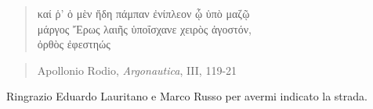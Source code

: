 \begin{verse}
	\begin{otherlanguage}{greek}
		καί ῥ' ὁ μὲν ἤδη πάμπαν ἐνίπλεον ᾧ ὑπὸ μαζῷ\\
		μάργος Ἔρως λαιῆς ὑποΐσχανε χειρὸς ἀγοστόν,\\
		ὀρθὸς ἐφεστηώς
	\end{otherlanguage}
\end{verse}

\begin{verse}
Apollonio Rodio, \emph{Argonautica}, III, 119-21
\end{verse}

\newpage

\vspace*{12cm}

Ringrazio Eduardo Lauritano e Marco Russo per avermi indicato la strada.
